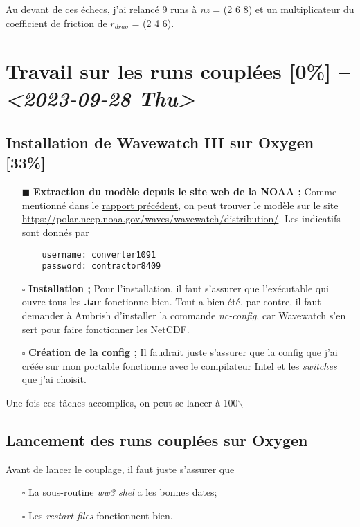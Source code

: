 \documentclass[10pt]{article}
\numberwithin{equation}{section}
\renewcommand{\boxtimes}{\blacksquare}
\begin{document}
Au devant de ces échecs, j'ai relancé 9 runs à \emph{nz} = (2 6 8) et un multiplicateur du coefficient de friction de \(r_{drag}\) = (2 4 6).

\section{Travail sur les runs couplées [0\%] -- \textit{<2023-09-28 Thu>}}
\label{sec:org80046ed}

\subsection{Installation de Wavewatch III sur Oxygen [33\%]}
\label{sec:org3c5c98e}
\begin{itemize}
\item[{$\boxtimes$}] \textbf{Extraction du modèle depuis le site web de la NOAA ;}
Comme mentionné dans le \href{rapport-2023-09-22.pdf}{rapport précédent}, on peut trouver le modèle sur le site \url{https://polar.ncep.noaa.gov/waves/wavewatch/distribution/}.
Les indicatifs sont donnés par
\begin{verbatim}
    username: converter1091
    password: contractor8409
\end{verbatim}
\item[{$\square$}] \textbf{Installation ;}
Pour l'installation, il faut s'assurer que l'exécutable qui ouvre tous les \textbf{.tar} fonctionne bien.
Tout a bien été, par contre, il faut demander à Ambrish d'installer la commande \emph{nc-config}, car Wavewatch s'en sert pour faire fonctionner les NetCDF.
\item[{$\square$}] \textbf{Création de la config ;}
Il faudrait juste s'assurer que la config que j'ai créée sur mon portable fonctionne avec le compilateur Intel et les \emph{switches} que j'ai choisit.
\end{itemize}

Une fois ces tâches accomplies, on peut se lancer à 100$\backslash$%

\subsection{Lancement des runs couplées sur Oxygen}
\label{sec:org484c59e}
Avant de lancer le couplage, il faut juste s'assurer que
\begin{itemize}
\item[{$\square$}] La sous-routine \emph{ww3 shel} a les bonnes dates;
\item[{$\square$}] Les \emph{restart files} fonctionnent bien.
\end{itemize}
\end{document}
